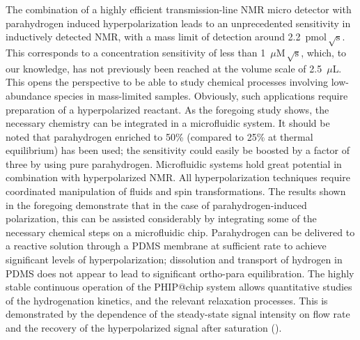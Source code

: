 The combination of a highly efficient transmission-line NMR micro detector with
parahydrogen induced hyperpolarization leads to an unprecedented sensitivity
in inductively detected NMR, with a mass limit of detection around
2.2~$\text{pmol}\,\sqrt{\mathrm{s}}$. This corresponds to a concentration
sensitivity of less than 1~$\mu \mathrm{M}\,\sqrt{\text{s}}$,
which, to our knowledge, has not previously been reached at the volume
scale of 2.5~$\mu$L.
This opens the perspective to be able to study chemical processes involving
low-abundance species in mass-limited samples. Obviously, such applications
require preparation of a hyperpolarized reactant. As the foregoing study shows,
the necessary chemistry can be integrated in a microfluidic system.
It should be noted that
parahydrogen enriched to 50\% (compared to 25\%
at thermal equilibrium) has been used; the sensitivity
could easily be boosted by a factor of three by using pure parahydrogen.
Microfluidic systems hold great potential in combination
with hyperpolarized NMR. All hyperpolarization techniques require coordinated
manipulation of fluids and spin transformations. The results shown in the
foregoing demonstrate that in the case of parahydrogen-induced polarization,
this can be assisted considerably by integrating some of the necessary chemical
steps on a microfluidic chip. Parahydrogen can be delivered to a reactive
solution through a PDMS membrane at sufficient rate to achieve significant
levels of hyperpolarization; dissolution and transport of hydrogen in PDMS does
not appear to lead to significant ortho-para equilibration.
The highly stable continuous operation
of the PHIP@chip system allows quantitative studies
of the hydrogenation kinetics, and the relevant relaxation processes.
This is demonstrated by the dependence of the steady-state signal intensity on
flow rate and the recovery of the
hyperpolarized signal after saturation ().

